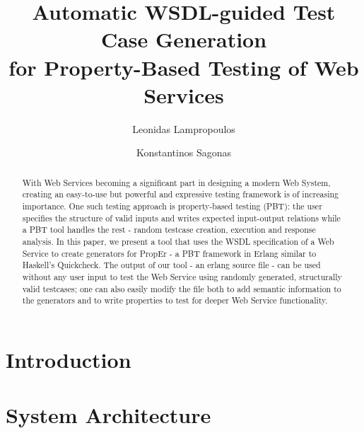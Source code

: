 \documentclass[submission,copyright,a4]{eptcs}
\title{Automatic WSDL-guided Test Case Generation\\
       for Property-Based Testing of Web Services}
\author{Leonidas Lampropoulos \and Konstantinos Sagonas}
\begin{document}
\maketitle

\begin{abstract}

With Web Services becoming a significant part in designing a modern Web System, creating an easy-to-use but powerful and expressive testing framework is of increasing importance. One such testing approach is property-based testing (PBT): the user specifies the structure of valid inputs and writes expected input-output relations while a PBT tool handles the rest - random testcase creation, execution and response analysis. In this paper, we present a tool that uses the WSDL specification of a Web Service to create generators for PropEr - a PBT framework in Erlang similar to Haskell's Quickcheck. The output of our tool - an erlang source file - can be used without any user input to test the Web Service using randomly generated, structurally valid testcases; one can also easily modify the file both to add semantic information to the generators and to write properties to test for deeper Web Service functionality.

\end{abstract}

\section{Introduction}



\section{System Architecture}
\end{document}
